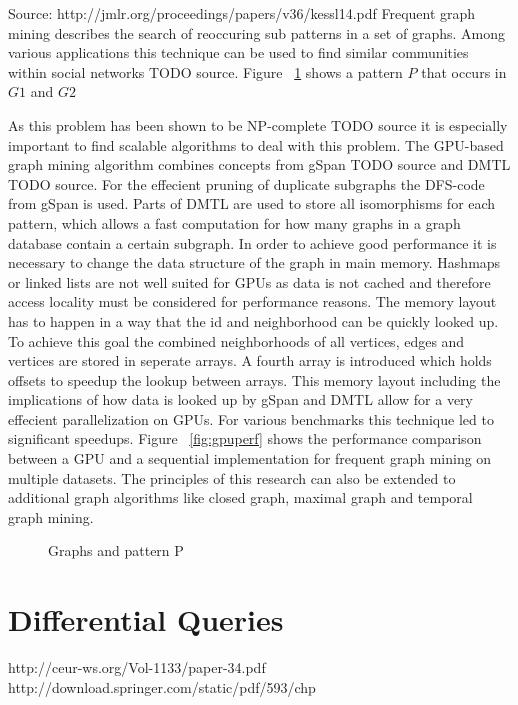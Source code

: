 \documentclass{sig-alternate}
\begin{document}
Source: http://jmlr.org/proceedings/papers/v36/kessl14.pdf
Frequent graph mining describes the search of reoccuring sub patterns 
in a set of graphs. Among various applications this technique can be used to
find similar communities within social networks TODO source.
Figure ~\ref{fig:subgraphs} shows a pattern $P$ that occurs in $G1$ and $G2$

As this problem has been shown to be NP-complete TODO source it is especially important to
find scalable algorithms to deal with this problem.
The GPU-based graph mining algorithm combines concepts from gSpan TODO source
and DMTL TODO source. 
For the effecient pruning of duplicate subgraphs the DFS-code from gSpan is used.
Parts of DMTL are used to store all isomorphisms for each pattern, which allows 
a fast computation for how many graphs in a graph database contain a certain subgraph.
In order to achieve good performance it is necessary 
to change the data structure of the graph in main memory. Hashmaps or linked lists
are not well suited for GPUs as data is not cached and therefore access locality 
must be considered for performance reasons. 
The memory layout has to happen in a way that the id and neighborhood can be quickly looked up.
To achieve this goal the combined neighborhoods of all vertices, edges and vertices are stored 
in seperate arrays. A fourth array is introduced which holds offsets to speedup the lookup between arrays.
This memory layout including the implications of how data is looked up by gSpan and DMTL allow
for a very effecient parallelization on GPUs.
For various benchmarks this technique led to significant speedups. Figure ~\ref{fig:gpuperf}
shows the performance comparison between a GPU and a sequential implementation 
for frequent graph mining on multiple datasets.
The principles of this research can also be extended to additional graph algorithms like closed graph,
maximal graph and temporal graph mining.

\begin{figure}
\centering
{}
\caption{Graphs and pattern P}
\label{fig:subgraphs}
\end{figure}

\begin{figure*}
\centering
{}
\caption{GPU Benchmarks}
\label{fig:gpuperf}
\end{figure*}

\section{Differential Queries}
http://ceur-ws.org/Vol-1133/paper-34.pdf
http://download.springer.com/static/pdf/593/chp%
\end{document}
